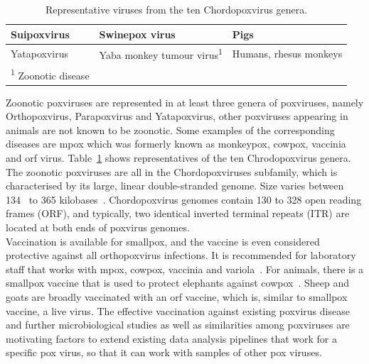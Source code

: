 \begin{table}[ht]
\begin{tabular}{lll}
	Suipoxvirus         & Swinepox virus                                  & Pigs                                        \\ \hline
	Yatapoxvirus        & Yaba monkey tumour virus\textsuperscript{1}     & Humans, rhesus monkeys                      \\ \hline
	\textsuperscript{1} Zoonotic disease &                                &                                             \\
	\end{tabular}
	\caption{Representative viruses from the ten Chordopoxvirus genera.}
	\label{tab:2-zoon}
\end{table}

Zoonotic poxviruses are represented in at least three genera of poxviruses, namely Orthopoxvirus, Parapoxvirus and Yatapoxvirus, other poxviruses appearing in animals are not known to be zoonotic. Some examples of the corresponding diseases are mpox which was formerly known as monkeypox, cowpox, vaccinia and orf virus. Table~\ref{tab:2-zoon} shows representatives of the ten Chrodopoxvirus genera. The zoonotic poxviruses are all in the Chordopoxviruses subfamily, which is characterised by its large, linear double-stranded genome. Size varies between 134~\cite{brunetti2003complete} to 365 kilobases~\cite{tulman2004genome}. Chordopoxvirus genomes contain 130 to 328 open reading frames (ORF), and typically, two identical inverted terminal repeats (ITR) are located at both ends of poxvirus genomes. \\
Vaccination is available for smallpox, and the vaccine is even considered protective against all orthopoxvirus infections. It is recommended for laboratory staff that works with mpox, cowpox, vaccinia and variola~\cite{cono2003smallpox}. For animals, there is a smallpox vaccine that is used to protect elephants against cowpox~\cite{kurth2008rat}. Sheep and goats are broadly vaccinated with an orf vaccine, which is, similar to smallpox vaccine, a live virus. The effective vaccination against existing poxvirus disease and further microbiological studies as well as similarities among poxviruses are motivating factors to extend existing data analysis pipelines that work for a specific pox virus, so that it can work with samples of other pox viruses.

